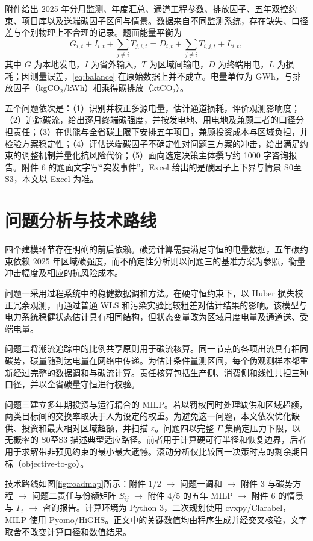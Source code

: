 \documentclass[UTF8,a4paper,zihao=-4,fontset=fandol]{ctexart}
\begin{document}
附件给出 2025 年分月监测、年度汇总、通道工程参数、排放因子、五年双控约束、项目库以及送端碳因子区间与情景。数据来自不同监测系统，存在缺失、口径差与个别物理上不合理的记录。题面能量平衡为
\begin{equation}
G_{i,t}+I_{i,t}+\sum_{j\neq i}T_{j,i,t}
=D_{i,t}+\sum_{j\neq i}T_{i,j,t}+L_{i,t},
\label{eq:balance}
\end{equation}
其中 $G$ 为本地发电，$I$ 为省外输入，$T$ 为区域间输电，$D$ 为终端用电，$L$ 为损耗；因测量误差，\eqref{eq:balance} 在原始数据上并不成立。电量单位为 GWh，与排放因子（kgCO$_2$/kWh）相乘得碳排放（ktCO$_2$）。

五个问题依次是：（1）识别并校正多源电量，估计通道损耗，评价观测影响度；（2）追踪碳流，给出逐月终端碳强度，并按发电地、用电地及兼顾二者的口径分担责任；（3）在供能与全省碳上限下安排五年项目，兼顾投资成本与区域负担，并检验方案稳定性；（4）评估送端碳因子不确定性对问题三方案的冲击，给出满足约束的调整机制并量化抗风险代价；（5）面向选定决策主体撰写约 1000 字咨询报告。附件 6 的题面文字写“突发事件”，Excel 给出的是碳因子上下界与情景 S0至S3，本文以 Excel 为准。

\section{问题分析与技术路线}

四个建模环节存在明确的前后依赖。碳势计算需要满足守恒的电量数据，五年碳约束依赖 2025 年区域碳强度，而不确定性分析则以问题三的基准方案为参照，衡量冲击幅度及相应的抗风险成本。

问题一采用过程系统中的稳健数据调和方法。在硬守恒约束下，以 Huber 损失校正冗余观测，再通过普通 WLS 和污染实验比较粗差对估计结果的影响。该模型与电力系统稳健状态估计具有相同结构，但状态变量改为区域月度电量及通道送、受端电量。

问题二将潮流追踪中的比例共享原则用于碳流核算。同一节点的各项出流具有相同碳势，碳量随到达电量在网络中传递。为估计条件量测区间，每个伪观测样本都重新经过完整的数据调和与碳流计算。责任核算包括生产侧、消费侧和线性共担三种口径，并以全省碳量守恒进行校验。

问题三建立多年期投资与运行耦合的 MILP。若以罚权同时处理缺供和区域超额，两类目标间的交换率取决于人为设定的权重。为避免这一问题，本文依次优化缺供、投资和最大相对区域超额，并扫描 $\varepsilon$。问题四以完整 $\Gamma$ 集确定压力下限，以无概率的 S0至S3 描述典型适应路径。前者用于计算硬可行半径和恢复边界，后者用于求解带非预见约束的最小最大遗憾。滚动分析仅比较同一决策时点的剩余期目标（objective-to-go）。

技术路线如图\ref{fig:roadmap}所示：附件 1/2 $\to$ 问题一调和 $\to$ 附件 3 与碳势方程 $\to$ 问题二责任与份额矩阵 $S_{ij}$ $\to$ 附件 4/5 的五年 MILP $\to$ 附件 6 的情景与 $\Gamma_t$ $\to$ 咨询报告。计算环境为 Python 3，二次规划使用 cvxpy/Clarabel，MILP 使用 Pyomo/HiGHS。正文中的关键数值均由程序生成并经交叉核验，文字取舍不改变计算口径和数值结果。
\end{document}
